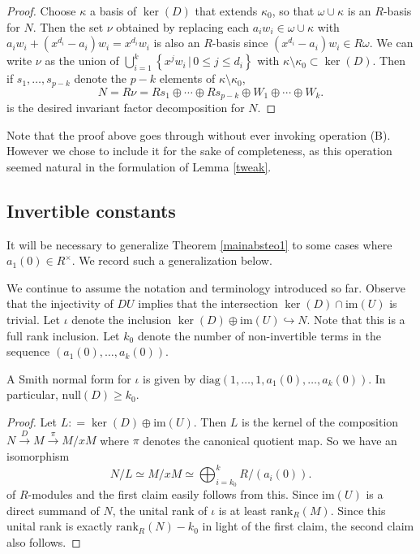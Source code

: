 \documentclass[ALCO, Unicode]{cedram}
\newcommand{\im}{\mathrm{im}}
\begin{document}
\begin{proof}
Choose $ \kappa $ a basis of $ \ker(D) $ that extends $ \kappa_{0} $, so that $ \omega  \cup \kappa  $ is an $ R $-basis for $ N $. Then the set $ \nu  $ obtained by replacing each $ a_{i} w_{i} \in \omega \cup \kappa $ with $  a_{i} w_{i} + ( x^{d_{i}}     - a_{i})w_{i}  = x^{d_{i}} w_{i} $ is also an $ R $-basis since $ (x^{d_{i}} - a_{i})   w_{i} \in  R \omega $.  We can write $ \nu  $ as the union of  $ \bigcup_{i=1}^{k} \left \{ x^{j} w_{i} \,  |  \, 0 \leq j \leq d_{i}  \right \} $ with $ \kappa \setminus \kappa_{0} \subset \ker(D)  $. Then if    $ s_{1}, \dots, s_{p -k } $ denote the $  p - k $ elements of $ \kappa \setminus \kappa_{0} $, $$  N = R \nu  =  R s_{1} \oplus \cdots \oplus R s_{p - k } \oplus  W_{1} \oplus \cdots \oplus W_{k}  . %
$$ 
is the desired  invariant factor decomposition for $ N $.   
\end{proof}      
\begin{remark} Note that the proof above goes through without ever invoking operation (B). However we chose to include it for the sake of completeness, as this operation seemed natural in the formulation of Lemma \ref{tweak}.   
\end{remark} 


\subsection{Invertible constants} 

It will be necessary to generalize  Theorem \ref{mainabsteo1} to some cases where $ a_{1}(0) \in R^{\times} $.  We record such a generalization  below.  


  We continue to assume the notation and terminology introduced so far.  Observe that the injectivity of $ DU $ implies that  the intersection $ \ker(D) \cap  \mathrm{im}(U) $ is trivial.  
Let $ \iota $ denote the inclusion $ \ker(D) \oplus \mathrm{im}(U)  \hookrightarrow N $. Note that this is a full rank inclusion. Let  $ k_{0}   $ denote the  number of non-invertible terms in the sequence $ (  a_{1}(0) , \ldots,  a_{k}(0)) $.   
\begin{lemma} \label{smithofD}   A Smith normal form for $ \iota $ is given  by   $  \mathrm{diag}(1,\ldots,1, a_{1}(0), \ldots,  a_{k}(0)) $. In particular, $ \mathrm{null}(D)  \geq  k_{0}    $. \end{lemma}    
\begin{proof}      Let $ L : =  \ker(D) \oplus \im(U  )$. Then $ L $ is the kernel of  the composition  $   N   \xrightarrow{D }  M  \xrightarrow{\, \pi  \, }   M / x M  $ 
where $ \pi $ denotes the canonical quotient map. So we have an isomorphism $$ N /  L  \simeq  M / x M  \simeq \bigoplus _{ i  = k_{0} } ^   {  k  }   R/(a_{i}(0)).  $$
of $ R $-modules and the  first claim easily follows from this.   Since  $ \mathrm{im}(U) $ is a  direct   summand of $ N $, the unital rank of $ \iota $ is at least $ \mathrm{rank}_{R}(M) $. Since this  unital rank 
is  exactly   $ \mathrm{rank}_{R} (N )  -  k_{0}    $ in light of  the first claim,  the second  claim also  follows.    
\end{proof}  
\end{document}
